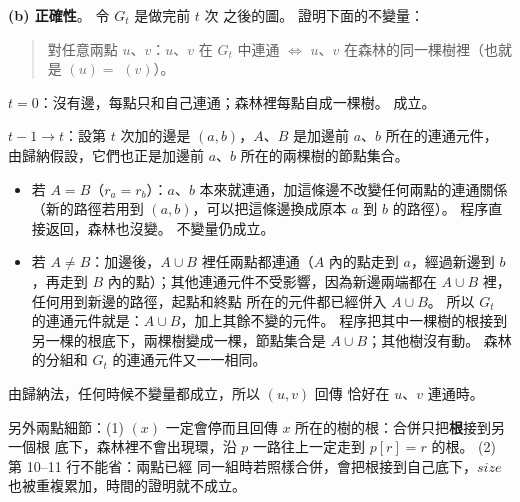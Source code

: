\begin{pastsoln}
\textbf{(b) 正確性}。 令 $G_t$ 是做完前 $t$ 次  之後的圖。 證明下面的不變量：

\begin{quote}
對任意兩點 $u$、$v$：$u$、$v$ 在 $G_t$ 中連通 $\iff$ $u$、$v$ 在森林的同一棵樹裡（也就是
$(u) = $ $(v)$）。
\end{quote}

\textbf{$t = 0$}：沒有邊，每點只和自己連通；森林裡每點自成一棵樹。 成立。

\textbf{$t - 1 \to t$}：設第 $t$ 次加的邊是 $(a, b)$，$A$、$B$ 是加邊前 $a$、$b$ 所在的連通元件，
由歸納假設，它們也正是加邊前 $a$、$b$ 所在的兩棵樹的節點集合。
\begin{itemize}
\item 若 $A = B$（$r_a = r_b$）：$a$、$b$ 本來就連通，加這條邊不改變任何兩點的連通關係
（新的路徑若用到 $(a, b)$，可以把這條邊換成原本 $a$ 到 $b$ 的路徑）。 程序直接返回，森林也沒變。
不變量仍成立。
\item 若 $A \ne B$：加邊後，$A \cup B$ 裡任兩點都連通（$A$ 內的點走到 $a$，經過新邊到 $b$，再走到
$B$ 內的點）；其他連通元件不受影響，因為新邊兩端都在 $A \cup B$ 裡，任何用到新邊的路徑，起點和終點
所在的元件都已經併入 $A \cup B$。 所以 $G_t$ 的連通元件就是：$A \cup B$，加上其餘不變的元件。
程序把其中一棵樹的根接到另一棵的根底下，兩棵樹變成一棵，節點集合是 $A \cup B$；其他樹沒有動。
森林的分組和 $G_t$ 的連通元件又一一相同。
\end{itemize}
由歸納法，任何時候不變量都成立，所以 $(u, v)$ 回傳 \TRUE 恰好在 $u$、$v$ 連通時。

另外兩點細節：(1) $(x)$ 一定會停而且回傳 $x$ 所在的樹的根：合併只把\textbf{根}接到另一個根
底下，森林裡不會出現環，沿 $p$ 一路往上一定走到 $p[r] = r$ 的根。 (2) 第 10--11 行不能省：兩點已經
同一組時若照樣合併，會把根接到自己底下，$\mathit{size}$ 也被重複累加，時間的證明就不成立。
\end{pastsoln}
